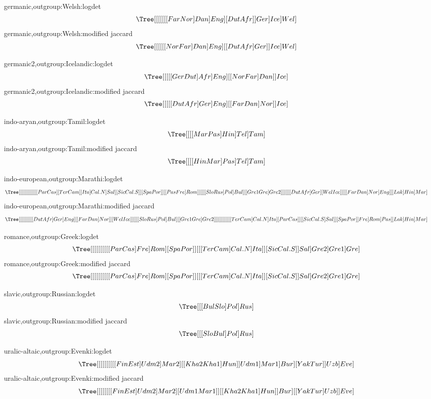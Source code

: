 germanic,outgroup:Welsh:logdet $$\Tree[  [  [  [  [  [  [ Far Nor ]  Dan ]  Eng ]   [ Dut Afr ]  ]  Ger ]  Ice ]  Wel ]$$
germanic,outgroup:Welsh:modified jaccard $$\Tree[  [  [  [  [  [ Nor Far ]  Dan ]  Eng ]   [  [ Dut Afr ]  Ger ]  ]  Ice ]  Wel ]$$



germanic2,outgroup:Icelandic:logdet $$\Tree[  [  [  [  [ Ger Dut ]  Afr ]  Eng ]   [  [ Nor Far ]  Dan ]  ]  Ice ]$$
germanic2,outgroup:Icelandic:modified jaccard $$\Tree[  [  [  [  [ Dut Afr ]  Ger ]  Eng ]   [  [ Far Dan ]  Nor ]  ]  Ice ]$$



indo-aryan,outgroup:Tamil:logdet $$\Tree[  [  [  [ Mar Pas ]  Hin ]  Tel ]  Tam ]$$
indo-aryan,outgroup:Tamil:modified jaccard $$\Tree[  [  [  [ Hin Mar ]  Pas ]  Tel ]  Tam ]$$



indo-european,outgroup:Marathi:logdet $$\Tree[  [  [  [  [  [  [  [  [  [  [  [  [ Par Cas ]   [ Ter Cam ]  ]  Ita ]  Cal.N ]  Sal ]   [ Sic Cal.S ]  ]   [ Spa Por ]  ]   [  [ Pas Fre ]  Rom ]  ]   [  [  [  [ Slo Rus ]  Pol ]  Bul ]   [  [ Gre1 Gre ]  Gre2 ]  ]  ]   [  [  [  [ Dut Afr ]  Ger ]   [ Wel Ice ]  ]   [  [  [ Far Dan ]  Nor ]  Eng ]  ]  ]  Lak ]  Hin ]  Mar ]$$
indo-european,outgroup:Marathi:modified jaccard $$\Tree[  [  [  [  [  [  [  [  [  [ Dut Afr ]  Ger ]  Eng ]   [  [ Far Dan ]  Nor ]  ]   [ Wel Ice ]  ]   [  [  [  [ Slo Rus ]  Pol ]  Bul ]   [  [ Gre1 Gre ]  Gre2 ]  ]  ]   [  [  [  [  [  [  [  [  [ Ter Cam ]  Cal.N ]  Ita ]   [ Par Cas ]  ]   [  [ Sic Cal.S ]  Sal ]  ]   [ Spa Por ]  ]  Fre ]  Rom ]  Pas ]  ]  Lak ]  Hin ]  Mar ]$$



romance,outgroup:Greek:logdet $$\Tree[  [  [  [  [  [  [  [  [  [ Par Cas ]  Fre ]  Rom ]   [ Spa Por ]  ]   [  [  [ Ter Cam ]  Cal.N ]  Ita ]  ]   [ Sic Cal.S ]  ]  Sal ]  Gre2 ]  Gre1 ]  Gre ]$$
romance,outgroup:Greek:modified jaccard $$\Tree[  [  [  [  [  [  [  [  [  [ Par Cas ]  Fre ]  Rom ]   [ Spa Por ]  ]   [  [  [ Ter Cam ]  Cal.N ]  Ita ]  ]   [ Sic Cal.S ]  ]  Sal ]  Gre2 ]  Gre1 ]  Gre ]$$



slavic,outgroup:Russian:logdet $$\Tree[  [  [ Bul Slo ]  Pol ]  Rus ]$$
slavic,outgroup:Russian:modified jaccard $$\Tree[  [  [ Slo Bul ]  Pol ]  Rus ]$$



uralic-altaic,outgroup:Evenki:logdet $$\Tree[  [  [  [  [  [  [  [  [  [ Fin Est ]  Udm2 ]  Mar2 ]   [  [ Kha2 Kha1 ]  Hun ]  ]  Udm1 ]  Mar1 ]  Bur ]   [ Yak Tur ]  ]  Uzb ]  Eve ]$$
uralic-altaic,outgroup:Evenki:modified jaccard $$\Tree[  [  [  [  [  [  [  [ Fin Est ]  Udm2 ]  Mar2 ]   [ Udm1 Mar1 ]  ]   [  [ Kha2 Kha1 ]  Hun ]  ]  Bur ]   [  [ Yak Tur ]  Uzb ]  ]  Eve ]$$



